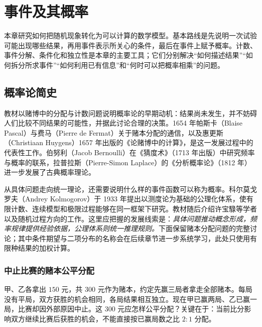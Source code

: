 \setcounter{chapter}{0} %
\chapter{事件及其概率}
\label{chap:study-events}

本章研究如何把随机现象转化为可以计算的数学模型。基本路线是先说明一次试验可能出现哪些结果，再用事件表示所关心的条件，最后在事件上赋予概率。计数、事件分解、条件化和独立性是本章的主要工具；它们分别解决“如何描述结果”“如何拆分所求事件”“如何利用已有信息”和“何时可以把概率相乘”的问题。

\section{概率论简史}
\label{sec:study-probability-history}

教材以赌博中的分配与计数问题说明概率论的早期动机：结果尚未发生，并不妨碍人们比较不同结果的可能性，并据此讨论合理的决策。1654 年帕斯卡（Blaise Pascal）与费马（Pierre de Fermat）关于赌本分配的通信，以及惠更斯（Christiaan Huygens）1657 年出版的《论赌博中的计算》，是这一发展过程中的代表性工作。伯努利（Jacob Bernoulli）在《猜度术》（1713 年出版）中研究频率与概率的联系，拉普拉斯（Pierre-Simon Laplace）的《分析概率论》（1812 年）进一步发展了古典概率理论。

从具体问题走向统一理论，还需要说明什么样的事件函数可以称为概率。科尔莫戈罗夫（Andrey Kolmogorov）于 1933 年提出以测度论为基础的公理化体系，使有限计数、连续模型和极限过程能够在同一框架下研究。教材随后介绍许宝騄等学者以及随机过程方向的工作。这里应把握的发展线索是：\emph{具体问题推动概念形成，频率规律提供经验依据，公理体系则统一推理规则。}下面保留赌本分配问题的完整讨论；其中条件期望与二项分布的名称会在后续章节进一步系统学习，此处只使用有限种结果的加权计算。

\subsection{中止比赛的赌本公平分配}
\label{subsec:points-fair-allocation}

甲、乙各拿出 $150$ 元，共 $300$ 元作为赌本，约定先赢三局者拿走全部赌本。每局没有平局，双方获胜的机会相同，各局结果相互独立。现在甲已赢两局、乙已赢一局，比赛却因外部原因中止。这 $300$ 元应怎样公平分配？关键在于：当前比分影响双方继续比赛后获胜的机会，不能直接按已赢局数之比 $2:1$ 分配。

